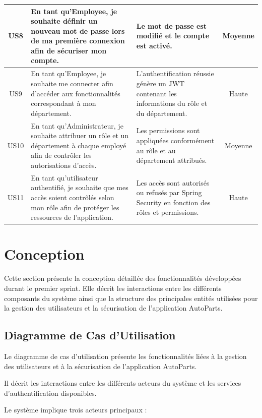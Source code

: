 \begin{longtable}{|c|>{\RaggedRight\arraybackslash}p{5cm}|>{\RaggedRight\arraybackslash}p{5cm}|c|}
US8 &
En tant qu'Employee, je souhaite définir un nouveau mot de passe lors de ma première connexion afin de sécuriser mon compte. &
Le mot de passe est modifié et le compte est activé. &
Moyenne
\\
\hline


US9 &
En tant qu'Employee, je souhaite me connecter afin d'accéder aux fonctionnalités correspondant à mon département. &
L'authentification réussie génère un JWT contenant les informations du rôle et du département. &
Haute
\\
\hline


US10 &
En tant qu'Administrateur, je souhaite attribuer un rôle et un département à chaque employé afin de contrôler les autorisations d'accès. &
Les permissions sont appliquées conformément au rôle et au département attribués. &
Moyenne
\\
\hline


US11 &
En tant qu'utilisateur authentifié, je souhaite que mes accès soient contrôlés selon mon rôle afin de protéger les ressources de l'application. &
Les accès sont autorisés ou refusés par Spring Security en fonction des rôles et permissions. &
Haute
\\
\hline




\end{longtable}


\section{Conception}

Cette section présente la conception détaillée des fonctionnalités développées durant le premier sprint.
Elle décrit les interactions entre les différents composants du système ainsi que la structure des principales entités utilisées pour la gestion des utilisateurs et la sécurisation de l'application AutoParts.

\subsection{Diagramme de Cas d'Utilisation}

Le diagramme de cas d'utilisation présente les fonctionnalités liées à la gestion des utilisateurs et à la sécurisation de l'application AutoParts.

Il décrit les interactions entre les différents acteurs du système et les services d'authentification disponibles.

Le système implique trois acteurs principaux :

